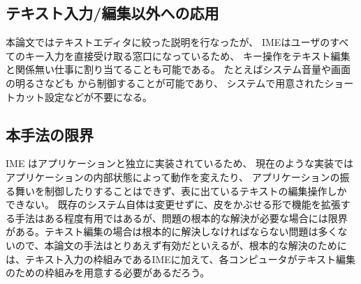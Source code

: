 \subsection{テキスト入力/編集以外への応用}

本論文ではテキストエディタに絞った説明を行なったが、
IMEはユーザのすべてのキー入力を直接受け取る窓口になっているため、
キー操作をテキスト編集と関係無い仕事に割り当てることも可能である。
%
たとえばシステム音量や画面の明るさなども
{\system}から制御することが可能であり、
システムで用意されたショートカット設定などが不要になる。

\subsection{本手法の限界}

IME はアプリケーションと独立に実装されているため、
現在のような実装ではアプリケーションの内部状態によって動作を変えたり、
アプリケーションの振る舞いを制御したりすることはできず、表に出ているテキストの編集操作しか
できない。 既存のシステム自体は変更せずに、皮をかぶせる形で機能を拡張す
る手法はある程度有用ではあるが、問題の根本的な解決が必要な場合には限界
がある。テキスト編集の場合は根本的に解決しなければならない問題は多くな
いので、本論文の手法はとりあえず有効だといえるが、根本的な解決のために
は、テキスト入力の枠組みであるIMEに加えて、各コンピュータがテキスト編集
のための枠組みを用意する必要があるだろう。


